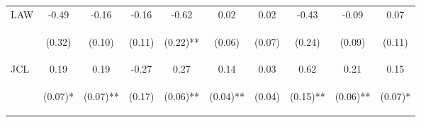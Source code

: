 \begin{center}
\begin{tabular}{lccccccccc}
\noalign{\smallskip}LAW & -0.49 & -0.16 & -0.16 & -0.62 & 0.02 & 0.02 & -0.43 & -0.09 & 0.07\\
 & \begin{footnotesize}(0.32)\end{footnotesize} & \begin{footnotesize}(0.10)\end{footnotesize} & \begin{footnotesize}(0.11)\end{footnotesize} & \begin{footnotesize}(0.22)**\end{footnotesize} & \begin{footnotesize}(0.06)\end{footnotesize} & \begin{footnotesize}(0.07)\end{footnotesize} & \begin{footnotesize}(0.24)\end{footnotesize} & \begin{footnotesize}(0.09)\end{footnotesize} & \begin{footnotesize}(0.11)\end{footnotesize}\\
\noalign{\smallskip}JCL & 0.19 & 0.19 & -0.27 & 0.27 & 0.14 & 0.03 & 0.62 & 0.21 & 0.15\\
 & \begin{footnotesize}(0.07)*\end{footnotesize} & \begin{footnotesize}(0.07)**\end{footnotesize} & \begin{footnotesize}(0.17)\end{footnotesize} & \begin{footnotesize}(0.06)**\end{footnotesize} & \begin{footnotesize}(0.04)**\end{footnotesize} & \begin{footnotesize}(0.04)\end{footnotesize} & \begin{footnotesize}(0.15)**\end{footnotesize} & \begin{footnotesize}(0.06)**\end{footnotesize} & \begin{footnotesize}(0.07)*\end{footnotesize}\\

\end{tabular}
\end{center}
